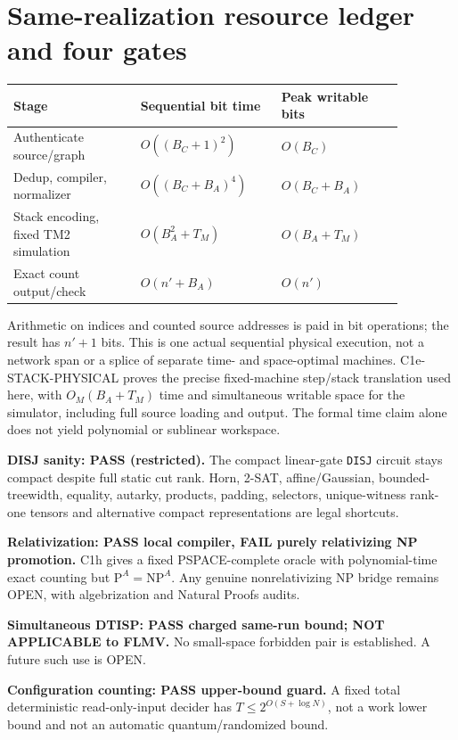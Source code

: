\documentclass[11pt]{article}
\begin{document}
\section{Same-realization resource ledger and four gates}
\begin{center}\small
\begin{tabular}{p{0.29\linewidth}p{0.31\linewidth}p{0.27\linewidth}}
Stage & Sequential bit time & Peak writable bits \\
\hline
Authenticate source/graph & $O((B_C+1)^2)$ & $O(B_C)$\\
Dedup, compiler, normalizer & $O((B_C+B_A)^4)$ & $O(B_C+B_A)$\\
Stack encoding, fixed TM2 simulation & $O(B_A^2+T_M)$ & $O(B_A+T_M)$\\
Exact count output/check & $O(n'+B_A)$ & $O(n')$\\
\end{tabular}
\end{center}
Arithmetic on indices and counted source addresses is paid in bit operations;
the result has $n'+1$ bits. This is one actual sequential physical execution,
not a network span or a splice of separate time- and space-optimal machines.
C1e-STACK-PHYSICAL proves the precise fixed-machine step/stack translation used here, with $O_M(B_A+T_M)$ time and simultaneous writable space for the simulator, including full source loading and output. The formal time claim alone does not yield polynomial or sublinear workspace.

\noindent\textbf{DISJ sanity: PASS (restricted).} The compact linear-gate
\texttt{DISJ} circuit stays compact despite full static cut rank. Horn,
2-SAT, affine/Gaussian, bounded-treewidth, equality, autarky,
products, padding, selectors, unique-witness rank-one tensors and
alternative compact representations are legal shortcuts.

\noindent\textbf{Relativization: PASS local compiler, FAIL purely relativizing NP promotion.}
C1h gives a fixed PSPACE-complete oracle with polynomial-time exact
counting but $\mathrm{P}^A=\mathrm{NP}^A$. Any genuine nonrelativizing
NP bridge remains OPEN, with algebrization and Natural Proofs audits.

\noindent\textbf{Simultaneous DTISP: PASS charged same-run bound;
NOT APPLICABLE to FLMV.} No small-space forbidden pair is established.
A future such use is OPEN.

\noindent\textbf{Configuration counting: PASS upper-bound guard.}
A fixed total deterministic read-only-input decider has
$T\le2^{O(S+\log N)}$, not a work lower bound and not an automatic
quantum/randomized bound.
\end{document}

